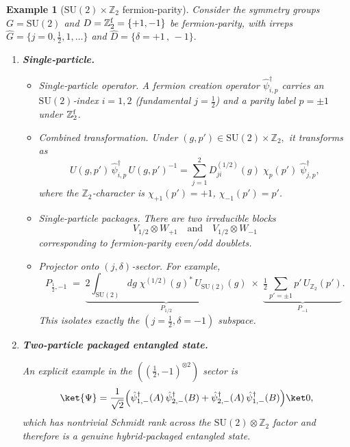 \documentclass[12pt,a4paper]{article}
\newtheorem{example}{Example}
\begin{document}
\begin{example}[$\mathrm{SU}(2)\times\mathbb Z_2$ fermion‐parity]
	Consider the symmetry groups $G=\mathrm{SU}(2)$ and $D = \mathbb Z_2^{\rm f} = \{+1,-1\}$ be fermion‐parity, with irreps
	$
	\widehat G=\{j=0,\tfrac12,1,\dots\}
	$
	and
	$
	\widehat D=\{\delta=+1\,,\,-1\}.
	$
	\begin{enumerate}
		\item \textbf{Single‐particle.}
		
		\begin{itemize}
			\item Single‐particle operator.
			A fermion creation operator
			$
			\hat\psi^\dagger_{i,p}
			$
			carries an $\mathrm{SU}(2)$‐index $i=1,2$ (fundamental $j=\tfrac12$) and a parity label $p=\pm1$ under $\mathbb Z_2^{\rm f}$.
			
			\item Combined transformation.
			Under
			$
			(g,p')\in \mathrm{SU}(2)\times\mathbb Z_2,
			$
			it transforms as
			\[
			U(g,p')\,\hat\psi^\dagger_{i,p}\,U(g,p')^{-1}
			=\sum_{j=1}^2D^{(1/2)}_{ji}(g)\;\chi_p(p')\;\hat\psi^\dagger_{j,p},
			\]
			where the $\mathbb Z_2$‐character is 
			$\chi_{+1}(p')=+1$, $\chi_{-1}(p')=p'$.
			
			\item Single-particle packages.
			There are two irreducible blocks
			\[
			V_{1/2}\otimes W_{+1}
			\quad\text{and}\quad
			V_{1/2}\otimes W_{-1}
			\]
			corresponding to fermion-parity even/odd doublets.
						
			\item Projector onto $(j,\delta)$‐sector.
			For example,
			\[
			P_{\tfrac12,-1}
			\;=\;
			\underbrace{2\!\int_{\mathrm{SU}(2)}dg\;\chi^{(1/2)}(g)^*\,U_{\mathrm{SU}(2)}(g)}_{P_{1/2}}
			\;\times\;
			\underbrace{\tfrac12\sum_{p'=\pm1}p'\,U_{\mathbb Z_2}(p')}_{P_{-1}}.
			\]
			This isolates exactly the $(j=\tfrac12,\delta=-1)$ subspace.
		\end{itemize}
		
		\item \textbf{Two-particle packaged entangled state.}
		
		An explicit example in the $((\tfrac12,-1)^{\otimes2})$ sector is
		\[
		\ket{\Psi}
		= \frac{1}{\sqrt2}\Bigl(
		\hat\psi^\dagger_{1,-}(A)\,\hat\psi^\dagger_{2,-}(B)
		+ \hat\psi^\dagger_{2,-}(A)\,\hat\psi^\dagger_{1,-}(B)
		\Bigr)\ket0,
		\]
		which has nontrivial Schmidt rank across the $\mathrm{SU}(2)\otimes\mathbb Z_2$ factor and therefore is a genuine hybrid‐packaged entangled state.
	\end{enumerate}
\end{example}
\end{document}
